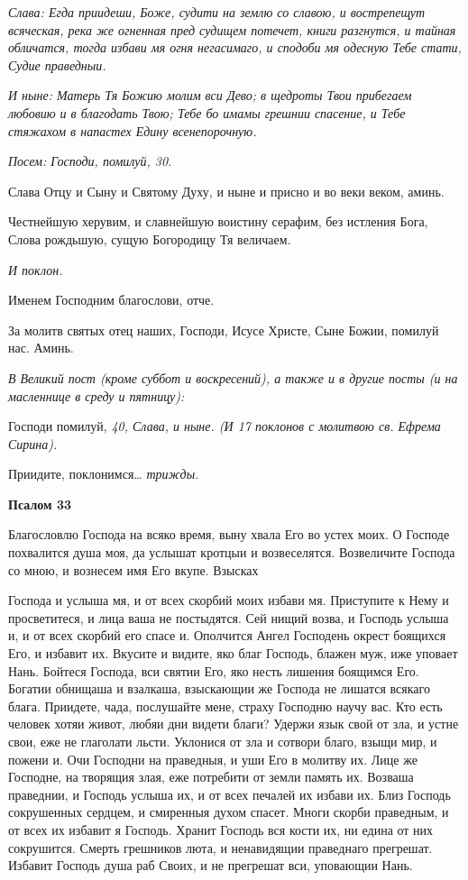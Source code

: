  \itshape Слава:\normalfont{} Егда приидеши, Боже, судити на землю со славою, и вострепещут
всяческая, река же огненная пред судищем потечет, книги разгнутся, и
тайная обличатся, тогда избави мя огня негасимаго, и сподоби мя одесную
Тебе стати, Судие праведныи.


 \itshape И ныне:\normalfont{} Матерь Тя Божию молим вси Дево; в щедроты Твои прибегаем
любовию и в благодать Твою; Тебе бо имамы грешнии спасение, и Тебе
стяжахом в напастех Едину всенепорочную.


 \itshape Посем:\normalfont{} Господи, помилуй, \itshape 30\normalfont{}.


   Слава Отцу и Сыну и Святому Духу, и ныне и присно и во веки веком,
аминь.


   Честнейшую херувим, и славнейшую воистину серафим, без истления
Бога, Слова рождьшую, сущую Богородицу Тя величаем.


 \itshape И поклон.\normalfont{}


   Именем Господним благослови, отче.


   За молитв святых отец наших, Господи, Исусе Христе, Сыне Божии,
помилуй нас. Аминь.


 \itshape В Великий пост (кроме суббот и воскресений), а также и в другие посты
(и на масленнице в среду и пятницу):\normalfont{}


   Господи помилуй, \itshape 40\normalfont{}, \itshape Слава, и ныне.\normalfont{} \itshape (И 17 поклонов с молитвою св.
Ефрема Сирина)\normalfont{}.
   


   Приидите, поклонимся… \itshape трижды\normalfont{}.



 

\bfseries Псалом 33\normalfont{}


   Благословлю Господа на всяко время, выну хвала Его во устех моих. О
Господе похвалится душа моя, да услышат кротцыи и возвеселятся.
Возвеличите Господа со мною, и вознесем имя Его вкупе. Взысках

Господа и услыша мя, и от всех скорбий моих избави мя. Приступите к
Нему и просветитеся, и лица ваша не постыдятся. Сей нищий возва, и
Господь услыша и, и от всех скорбий его спасе и. Ополчится Ангел
Господень окрест боящихся Его, и избавит их. Вкусите и видите, яко
благ Господь, блажен муж, иже уповает Нань. Бойтеся Господа, вси
святии Его, яко несть лишения боящимся Его. Богатии обнищаша и
взалкаша, взыскающии же Господа не лишатся всякаго блага. Приидете,
чада, послушайте мене, страху Господню научу вас. Кто есть человек
хотяи живот, любяи дни видети благи? Удержи язык свой от зла, и
устне свои, еже не глаголати льсти. Уклонися от зла и сотвори благо,
взыщи мир, и пожени и. Очи Господни на праведныя, и уши Его в
молитву их. Лице же Господне, на творящия злая, еже потребити
от земли память их. Возваша праведнии, и Господь услыша их, и
от всех печалей их избави их. Близ Господь сокрушенных сердцем,
и смиренныя духом спасет. Многи скорби праведным, и от всех их
избавит я Господь. Хранит Господь вся кости их, ни едина от них
сокрушится. Смерть грешников люта, и ненавидящии праведнаго прегрешат.
Избавит Господь душа раб Своих, и не прегрешат вси, уповающии
Нань.



